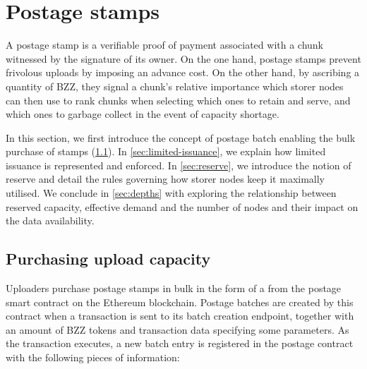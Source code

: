 \section{Postage stamps}\label{sec:postage-stamps}

A postage stamp is a verifiable proof of payment associated with a chunk witnessed by the signature of its owner. On the one hand, postage stamps prevent frivolous uploads by imposing an advance cost. On the other hand, by ascribing a quantity of BZZ, they signal a chunk's relative importance which storer nodes can then use to rank chunks when selecting which ones to retain and serve, and which ones to garbage collect in the event of capacity shortage.

In this section, we first introduce the concept of postage batch enabling the bulk purchase of stamps (\ref{sec:purchasing-upload}). In \ref{sec:limited-issuance}, we explain how limited issuance is represented and enforced. In \ref{sec:reserve}, we introduce the notion of reserve and detail the rules governing how storer nodes keep it maximally utilised. We conclude in \ref{sec:depths} with exploring the relationship between reserved capacity, effective demand and the number of nodes and their impact on the data availability.

\subsection{Purchasing upload capacity}\label{sec:purchasing-upload}


Uploaders purchase postage stamps in bulk in the form of a  from the postage smart contract on the Ethereum blockchain. Postage batches are created by this contract when a transaction is sent to its batch creation endpoint, together with an amount of BZZ tokens and transaction data specifying some parameters. As the transaction executes, a new batch entry is registered in the postage contract with the following pieces of information:

